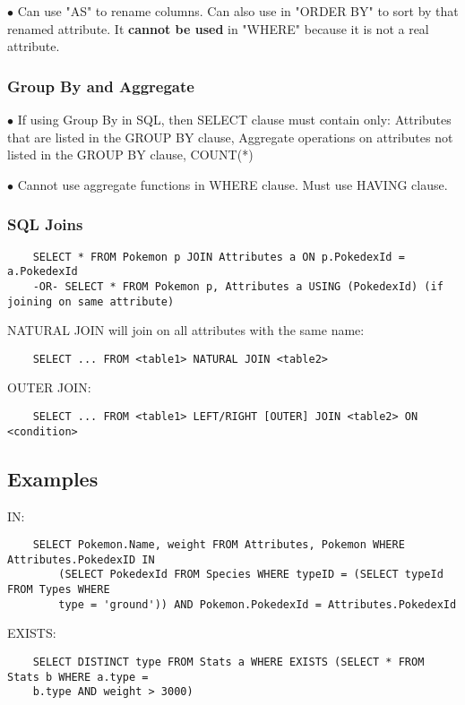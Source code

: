 \documentclass[9pt]{extarticle}
\begin{document}
$\bullet$ Can use "AS" to rename columns. Can also use in "ORDER BY" to sort by that 
renamed attribute. It \textbf{cannot be used} in "WHERE" because it is not a 
real attribute.

\subsubsection*{Group By and Aggregate}
$\bullet$ If using Group By in SQL, then SELECT clause must contain only: 
Attributes that are listed in the GROUP BY clause, Aggregate operations on 
attributes not listed in the GROUP BY clause, COUNT(*)

$\bullet$ Cannot use aggregate functions in WHERE clause. Must use HAVING clause.

\subsubsection*{SQL Joins}
\begin{verbatim}
    SELECT * FROM Pokemon p JOIN Attributes a ON p.PokedexId = a.PokedexId
    -OR- SELECT * FROM Pokemon p, Attributes a USING (PokedexId) (if joining on same attribute)
\end{verbatim}
NATURAL JOIN will join on all attributes with the same name:
\begin{verbatim}
    SELECT ... FROM <table1> NATURAL JOIN <table2>
\end{verbatim}
OUTER JOIN:
\begin{verbatim}
    SELECT ... FROM <table1> LEFT/RIGHT [OUTER] JOIN <table2> ON <condition>
\end{verbatim}

\subsection*{Examples}

IN:
\begin{verbatim}
    SELECT Pokemon.Name, weight FROM Attributes, Pokemon WHERE Attributes.PokedexID IN
        (SELECT PokedexId FROM Species WHERE typeID = (SELECT typeId FROM Types WHERE 
        type = 'ground')) AND Pokemon.PokedexId = Attributes.PokedexId
\end{verbatim}

EXISTS:
\begin{verbatim}
    SELECT DISTINCT type FROM Stats a WHERE EXISTS (SELECT * FROM Stats b WHERE a.type = 
    b.type AND weight > 3000)
\end{verbatim}
\end{document}
